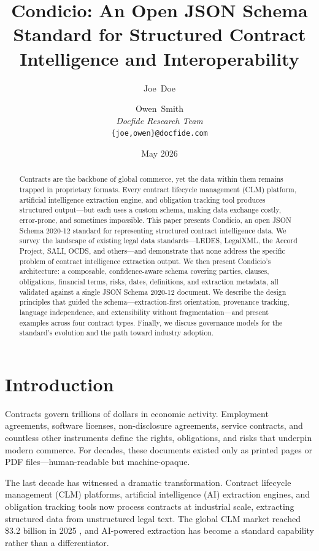 \documentclass[11pt,a4paper]{article}
\title{\textbf{Condicio: An Open JSON Schema Standard for Structured Contract Intelligence and Interoperability}}
\author{
  Joe~Doe \and Owen~Smith \\
  \textit{Docfide Research Team} \\
  \texttt{\{joe,owen\}@docfide.com}
}
\date{May 2026}
\begin{document}
\maketitle

\begin{abstract}
Contracts are the backbone of global commerce, yet the data within them remains trapped in proprietary formats. Every contract lifecycle management (CLM) platform, artificial intelligence extraction engine, and obligation tracking tool produces structured output---but each uses a custom schema, making data exchange costly, error-prone, and sometimes impossible. This paper presents Condicio, an open JSON Schema 2020-12 standard for representing structured contract intelligence data. We survey the landscape of existing legal data standards---LEDES, LegalXML, the Accord Project, SALI, OCDS, and others---and demonstrate that none address the specific problem of contract intelligence extraction output. We then present Condicio's architecture: a composable, confidence-aware schema covering parties, clauses, obligations, financial terms, risks, dates, definitions, and extraction metadata, all validated against a single JSON Schema 2020-12 document. We describe the design principles that guided the schema---extraction-first orientation, provenance tracking, language independence, and extensibility without fragmentation---and present examples across four contract types. Finally, we discuss governance models for the standard's evolution and the path toward industry adoption.
\end{abstract}

\section{Introduction}

Contracts govern trillions of dollars in economic activity. Employment agreements, software licenses, non-disclosure agreements, service contracts, and countless other instruments define the rights, obligations, and risks that underpin modern commerce. For decades, these documents existed only as printed pages or PDF files---human-readable but machine-opaque.

The last decade has witnessed a dramatic transformation. Contract lifecycle management (CLM) platforms, artificial intelligence (AI) extraction engines, and obligation tracking tools now process contracts at industrial scale, extracting structured data from unstructured legal text. The global CLM market reached \$3.2 billion in 2025 \cite{clm-market-2025}, and AI-powered extraction has become a standard capability rather than a differentiator.
\end{document}
